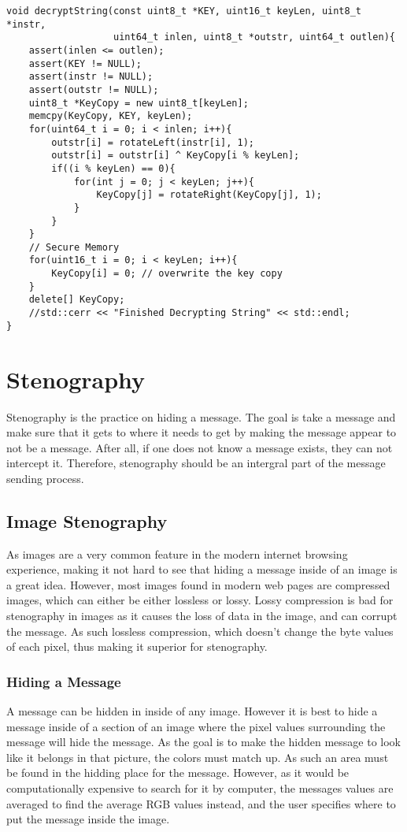 \documentclass[12pt]{article}
\begin{document}
    \singlespacing
    \begin{lstlisting}[caption=C++ Decryption Code]
void decryptString(const uint8_t *KEY, uint16_t keyLen, uint8_t *instr,
                   uint64_t inlen, uint8_t *outstr, uint64_t outlen){
    assert(inlen <= outlen);
    assert(KEY != NULL);
    assert(instr != NULL);
    assert(outstr != NULL);
    uint8_t *KeyCopy = new uint8_t[keyLen];
    memcpy(KeyCopy, KEY, keyLen);
    for(uint64_t i = 0; i < inlen; i++){
        outstr[i] = rotateLeft(instr[i], 1);
        outstr[i] = outstr[i] ^ KeyCopy[i % keyLen];
        if((i % keyLen) == 0){
            for(int j = 0; j < keyLen; j++){
                KeyCopy[j] = rotateRight(KeyCopy[j], 1);
            }
        }
    }
    // Secure Memory
    for(uint16_t i = 0; i < keyLen; i++){
        KeyCopy[i] = 0; // overwrite the key copy
    }
    delete[] KeyCopy;
    //std::cerr << "Finished Decrypting String" << std::endl;
}
    \end{lstlisting}
    \doublespacing
 
\section{Stenography}
  Stenography is the practice on hiding a message. The goal is take
  a message and make sure that it gets to where it needs to get by
  making the message appear to not be a message. After all, if one
  does not know a message exists, they can not intercept it. Therefore,
  stenography should be an intergral part of the message sending process.
  
  \subsection{Image Stenography}
    As images are a very common feature in the modern internet browsing
    experience, making it not hard to see that hiding a message inside 
    of an image is a great idea. However, most images found in 
    modern web pages are compressed images, which can either be either
    lossless or lossy. Lossy compression is bad for stenography in 
    images as it causes the loss of data in the image, and can
    corrupt the message. As such lossless compression, which doesn't 
    change the byte values of each pixel, thus making it superior 
    for stenography.
    
    \subsubsection{Hiding a Message}
      A message can be hidden in inside of any image. However it is best 
      to hide a message inside of a section of an image where the pixel
      values surrounding the message will hide the message. As the goal
      is to make the hidden message to look like it belongs in that
      picture, the colors must match up. As such an area must be found
      in the hidding place for the message. However, as it would be
      computationally expensive to search for it by computer, the
      messages values are averaged to find the average RGB values 
      instead, and the user specifies where to put the message 
      inside the image.
      
\end{document}
